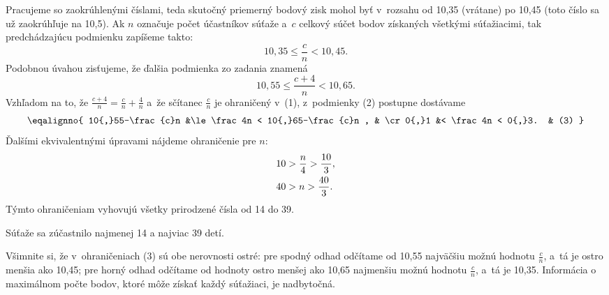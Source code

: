 {%
Pracujeme so zaokrúhlenými číslami, teda skutočný priemerný bodový zisk mohol byť v~rozsahu od 10,35 (vrátane) po 10,45 (toto číslo sa už zaokrúhľuje na 10,5).
Ak $n$ označuje počet účastníkov súťaže a~$c$ celkový súčet bodov získaných všetkými súťažiacimi, tak predchádzajúcu podmienku zapíšeme takto:
$$
10{,}35 \le \frac{c}{n} < 10{,}45 . \tag{1}
$$
Podobnou úvahou zisťujeme, že ďalšia podmienka zo zadania znamená
$$
10{,}55 \le \frac{c+4}{n} < 10{,}65 . \tag{2}
$$
Vzhľadom na to, že $\frac{c+4}n=\frac{c}n+\frac4n$ a~že sčítanec $\frac{c}n$ je ohraničený v~(1), z~podmienky (2) postupne dostávame
$$
\eqalignno{
10{,}55-\frac{c}n &\le \frac4n < 10{,}65-\frac{c}n , & \cr
0{,}1 &< \frac4n < 0{,}3. & (3) }
$$
Ďalšími ekvivalentnými úpravami nájdeme ohraničenie pre $n$:
$$
\aligned
10 &> \frac{n}4 > \frac{10}3 , \\
40 &> n > \frac{40}3.
\endaligned
$$
Týmto ohraničeniam vyhovujú všetky prirodzené čísla od 14 do 39.

Súťaže sa zúčastnilo najmenej 14 a najviac 39 detí.

\poznamky
Všimnite si, že v~ohraničeniach (3) sú obe nerovnosti ostré:
pre spodný odhad odčítame od 10,55 najväčšiu možnú hodnotu $\frac{c}n$, a~tá je ostro menšia ako 10,45;
pre horný odhad odčítame od hodnoty ostro menšej ako 10,65 najmenšiu možnú hodnotu $\frac{c}n$, a~tá je 10,35.
Informácia o maximálnom počte bodov, ktoré môže získať každý súťažiaci, je nadbytočná.

}
